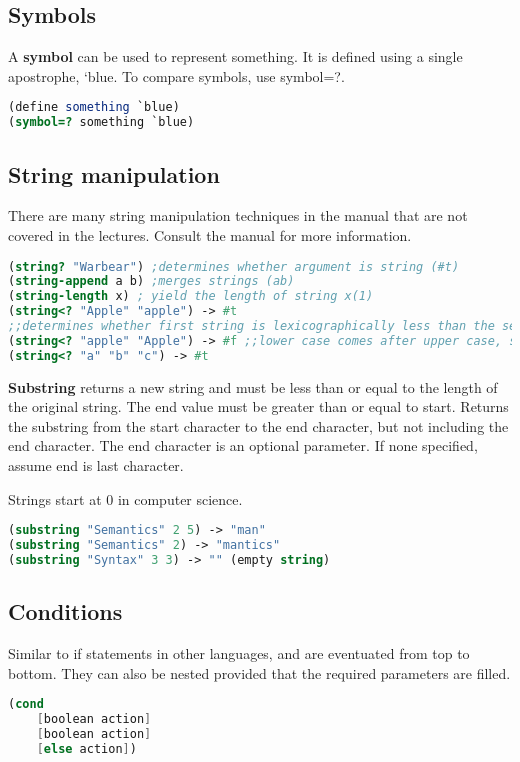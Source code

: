 \documentclass[english, 12pt]{article}
\begin{document}
\subsection{Symbols}
\begin{defn}
A \textbf{symbol} can be used to represent something. It is defined using a single apostrophe, `blue.
To compare symbols, use symbol=?.
\begin{lstlisting}[language=Scheme]
(define something `blue)
(symbol=? something `blue)
\end{lstlisting}
\end{defn}
\subsection{String manipulation}
There are many string manipulation techniques in the manual that are not covered in the lectures. Consult the manual for more information.
\begin{lstlisting}[language=Scheme]
(string? "Warbear") ;determines whether argument is string (#t)
(string-append a b) ;merges strings (ab)
(string-length x) ; yield the length of string x(1)
(string<? "Apple" "apple") -> #t 
;;determines whether first string is lexicographically less than the second. 
(string<? "apple" "Apple") -> #f ;;lower case comes after upper case, so a > A
(string<? "a" "b" "c") -> #t

\end{lstlisting}
\begin{defn}
\textbf{Substring} returns a new string and must be less than or equal to the length of the original string.
The end value must be greater than or equal to start. Returns the substring from the start character to the end character, but not including the end character.
The end character is an optional parameter. If none specified, assume end is last character.
\end{defn}
\begin{note}
Strings start at 0 in computer science. 
\end{note}
\begin{lstlisting}[language=Scheme]
(substring "Semantics" 2 5) -> "man"
(substring "Semantics" 2) -> "mantics"
(substring "Syntax" 3 3) -> "" (empty string)

\end{lstlisting}
\subsection{Conditions}
Similar to if statements in other languages, and are eventuated from top to bottom. 
They can also be nested provided that the required parameters are filled.
\begin{lstlisting}[language=Scheme]
(cond 
	[boolean action]
	[boolean action]
	[else action])
\end{lstlisting}
\end{document}
